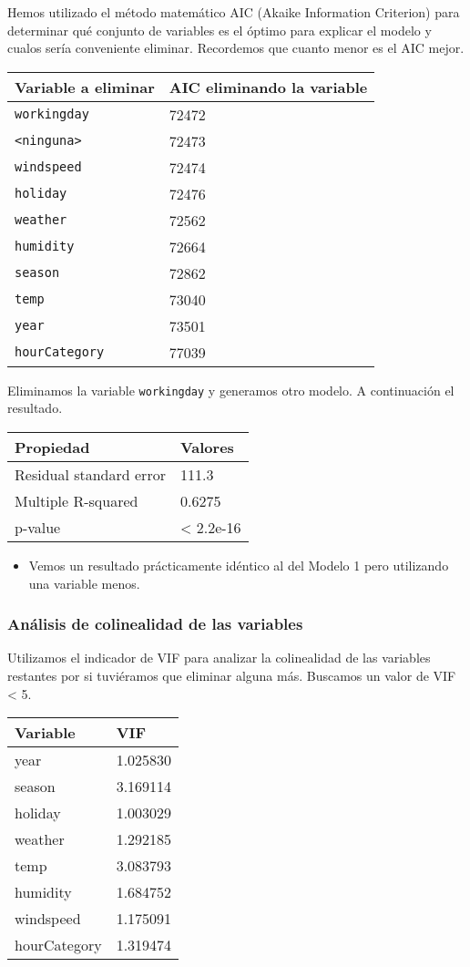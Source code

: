 \documentclass[
]{article}
\providecommand{\tightlist}{%
  \setlength{\itemsep}{0pt}\setlength{\parskip}{0pt}}
\begin{document}
Hemos utilizado el método matemático AIC (Akaike Information Criterion)
para determinar qué conjunto de variables es el óptimo para explicar el
modelo y cualos sería conveniente eliminar. Recordemos que cuanto menor
es el AIC mejor.

\begin{longtable}[]{@{}ll@{}}
\toprule
Variable a eliminar & AIC eliminando la variable\tabularnewline
\midrule
\endhead
\texttt{workingday} & 72472\tabularnewline
\texttt{\textless{}ninguna\textgreater{}} & 72473\tabularnewline
\texttt{windspeed} & 72474\tabularnewline
\texttt{holiday} & 72476\tabularnewline
\texttt{weather} & 72562\tabularnewline
\texttt{humidity} & 72664\tabularnewline
\texttt{season} & 72862\tabularnewline
\texttt{temp} & 73040\tabularnewline
\texttt{year} & 73501\tabularnewline
\texttt{hourCategory} & 77039\tabularnewline
\bottomrule
\end{longtable}

Eliminamos la variable \texttt{workingday} y generamos otro modelo. A
continuación el resultado.

\begin{longtable}[]{@{}ll@{}}
\toprule
Propiedad & Valores\tabularnewline
\midrule
\endhead
Residual standard error & 111.3\tabularnewline
Multiple R-squared & 0.6275\tabularnewline
p-value & \textless{} 2.2e-16\tabularnewline
\bottomrule
\end{longtable}

\begin{itemize}
\tightlist
\item
  Vemos un resultado prácticamente idéntico al del Modelo 1 pero
  utilizando una variable menos.
\end{itemize}

\hypertarget{anuxe1lisis-de-colinealidad-de-las-variables}{%
\subsubsection{Análisis de colinealidad de las
variables}\label{anuxe1lisis-de-colinealidad-de-las-variables}}

Utilizamos el indicador de VIF para analizar la colinealidad de las
variables restantes por si tuviéramos que eliminar alguna más. Buscamos
un valor de VIF \textless{} 5.

\begin{longtable}[]{@{}ll@{}}
\toprule
Variable & VIF\tabularnewline
\midrule
\endhead
year & 1.025830\tabularnewline
season & 3.169114\tabularnewline
holiday & 1.003029\tabularnewline
weather & 1.292185\tabularnewline
temp & 3.083793\tabularnewline
humidity & 1.684752\tabularnewline
windspeed & 1.175091\tabularnewline
hourCategory & 1.319474\tabularnewline
\bottomrule
\end{longtable}
\end{document}
